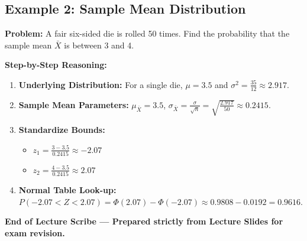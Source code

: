 \documentclass[11pt]{article}
\begin{document}
\subsection{Example 2: Sample Mean Distribution}
\textbf{Problem:} A fair six-sided die is rolled 50 times. Find the probability that the sample mean $\bar{X}$ is between 3 and 4.

\textbf{Step-by-Step Reasoning:}
\begin{enumerate}
    \item \textbf{Underlying Distribution:} For a single die, $\mu = 3.5$ and $\sigma^2 = \frac{35}{12} \approx 2.917$.
    \item \textbf{Sample Mean Parameters:} $\mu_{\bar{X}} = 3.5$, $\sigma_{\bar{X}} = \frac{\sigma}{\sqrt{n}} = \sqrt{\frac{2.917}{50}} \approx 0.2415$.
    \item \textbf{Standardize Bounds:}
    \begin{itemize}
        \item $z_1 = \frac{3 - 3.5}{0.2415} \approx -2.07$
        \item $z_2 = \frac{4 - 3.5}{0.2415} \approx 2.07$
    \end{itemize}
    \item \textbf{Normal Table Look-up:} $P(-2.07 < Z < 2.07) = \Phi(2.07) - \Phi(-2.07) \approx 0.9808 - 0.0192 = 0.9616$.
\end{enumerate}

\vfill
\noindent \textbf{End of Lecture Scribe --- Prepared strictly from Lecture Slides for exam revision.}
\end{document}
